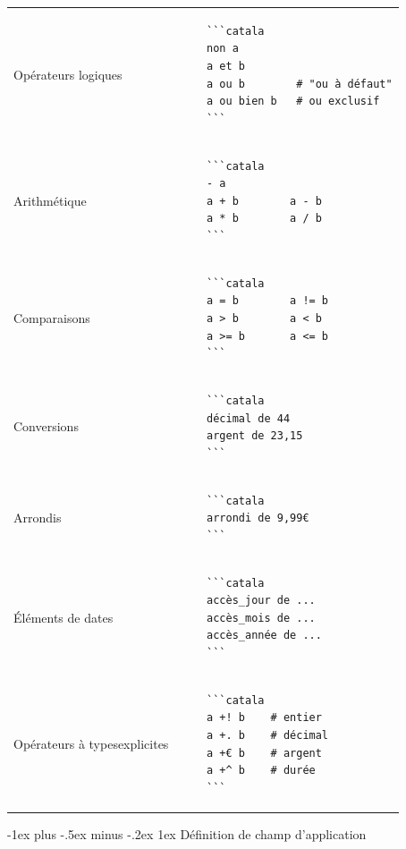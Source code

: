 \documentclass{article}
\makeatletter
\newcommand\articlenormalsize{\fontsize{10pt}{12pt}\selectfont}
\renewcommand{\section}{\@startsection{section}{1}{0mm}%
                                {-1ex plus -.5ex minus -.2ex}%
                                {1ex}%
                                {\normalfont\articlenormalsize\bfseries}}
\newenvironment{catala}{%
  \VerbatimEnvironment
  \let\FV@ListVSpace\relax
  \begin{verbatim}}%
 {\end{verbatim}}
\makeatother
\begin{document}
\begin{multicols}{3}
\begin{tabular}{@{}p{\cola}p{\colb}@{}}
  Opérateurs logiques & \begin{catala}
    ```catala
    non a
    a et b
    a ou b        # "ou à défaut"
    a ou bien b   # ou exclusif
    ```
  \end{catala}
  \\
  Arithmétique & \begin{catala}
    ```catala
    - a
    a + b        a - b
    a * b        a / b
    ```
  \end{catala}
  \\
  Comparaisons &
  \begin{catala}
    ```catala
    a = b        a != b
    a > b        a < b
    a >= b       a <= b
    ```
  \end{catala}
  \\
  Conversions & \begin{catala}
    ```catala
    décimal de 44
    argent de 23,15
    ```
  \end{catala}
  \\
  Arrondis & \begin{catala}
    ```catala
    arrondi de 9,99€
    ```
  \end{catala}
  \\
  Éléments de dates & \begin{catala}
    ```catala
    accès_jour de ...
    accès_mois de ...
    accès_année de ...
    ```
  \end{catala}
  \\
  Opérateurs à types\newline explicites &
  \begin{catala}
    ```catala
    a +! b    # entier
    a +. b    # décimal
    a +€ b    # argent
    a +^ b    # durée
    ```
  \end{catala}
  \\
\end{tabular}

\columnbreak

\section{Définition de champ d'application}


\end{multicols}
\end{document}
